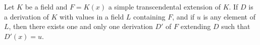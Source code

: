 Let $K$ be a field and $F = K(x)$ a simple transcendental extension of $K$. If $D$ is a derivation of $K$ with values in a field $L$ containing $F$, and if $u$ is any element of $L$, then there exists one and only one derivation $D'$ of $F$ extending $D$ such that $D'(x) = u$.

